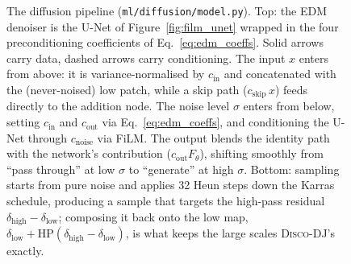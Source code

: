 \documentclass{report}
\begin{document}
\begin{figure}[h!]
{}
\caption{The diffusion pipeline (\texttt{ml/diffusion/model.py}). Top: the EDM denoiser is the U-Net of Figure~\ref{fig:film_unet} wrapped in the four preconditioning coefficients of Eq.~\eqref{eq:edm_coeffs}. Solid arrows carry data, dashed arrows carry conditioning. The input $x$ enters from above: it is variance-normalised by \mbox{$c_{\mathrm{in}}$} and concatenated with the (never-noised) low patch, while a skip path ($c_{\mathrm{skip}}\,x$) feeds directly to the addition node. The noise level $\sigma$ enters from below, setting \mbox{$c_{\mathrm{in}}$} and \mbox{$c_{\mathrm{out}}$} via Eq.~\eqref{eq:edm_coeffs}, and conditioning the U-Net through \mbox{$c_{\mathrm{noise}}$} via FiLM. The output blends the identity path with the network's contribution (\mbox{$c_{\mathrm{out}} F_\theta$}), shifting smoothly from ``pass through'' at low \mbox{$\sigma$} to ``generate'' at high \mbox{$\sigma$}. Bottom: sampling starts from pure noise and applies 32 Heun steps down the Karras schedule, producing a sample that targets the high-pass residual $\delta_{\mathrm{high}} - \delta_{\mathrm{low}}$; composing it back onto the low map, $\delta_{\mathrm{low}} + \mathrm{HP}(\delta_{\mathrm{high}} - \delta_{\mathrm{low}})$, is what keeps the large scales \textsc{Disco-DJ}'s exactly.}
\label{fig:edm_sampling}
\end{figure}
\end{document}
